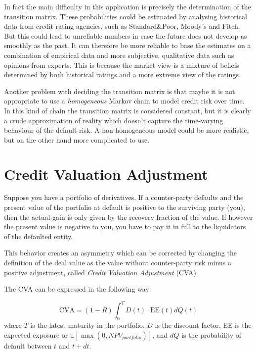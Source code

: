 In fact the main difficulty in this application is precisely the determination of the transition matrix. These probabilities could be estimated by analysing historical data from credit rating agencies, such as Standard\&Poor, Moody's and Fitch. But this could lead to unreliable numbers in case the future does not develop as smoothly as the past. It can therefore be more reliable to base the estimates on a combination of empirical data and more subjective, qualitative data such as opinions from experts. This is because the market view is a mixture of beliefs determined by both historical ratings and a more extreme view of the ratings. 

Another problem with deciding the transition matrix is that maybe it is not appropriate to use a \emph{homogeneous} Markov chain to model credit risk over time. In this kind of chain the transition matrix is considered constant, but it is clearly a crude approximation of reality which doesn't capture the time-varying behaviour of the default risk. A non-homogeneous model could be more realistic, but on the other hand more complicated to use. 

\section{Credit Valuation Adjustment}
\label{credit-valuation-adjustment}

Suppose you have a portfolio of derivatives. If a counter-party defaults and the present value of the portfolio at default is positive to the surviving party (you), then the actual gain is only given by the recovery fraction of the value. If however the present value is negative to you, you have to pay it in full to the liquidators of the defaulted entity.

This behavior creates an asymmetry which can be corrected by changing the definition of the deal value as the value without counter-party risk minus a positive adjustment, called \emph{Credit Valuation Adjustment} (CVA).

The CVA can be expressed in the following way:

\begin{equation}
\text{CVA} = (1-R) \int_0^T D(t) \cdot \textrm{EE}(t) dQ(t)
\label{eq:cva}
\end{equation}
where $T$ is the latest maturity in the portfolio, $D$ is the discount factor, EE is the expected exposure or $\mathbb{E}[\max(0, NPV_{portfolio})]$, and $dQ$ is the probability of default between $t$ and $t+dt$.

